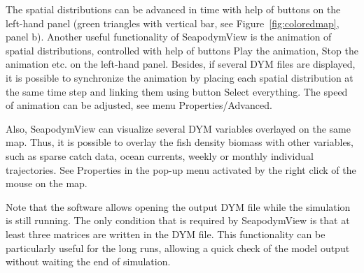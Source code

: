 The spatial distributions can be advanced in time with help of buttons on the left-hand panel (green triangles with vertical bar, see Figure~\ref{fig:coloredmap}, panel b). Another useful functionality of SeapodymView is the animation of spatial distributions, controlled with help of buttons {\ttfamily Play the animation}, {\ttfamily Stop the animation} etc. on the left-hand panel. Besides, if several DYM files are displayed, it is possible to synchronize the animation by placing each spatial distribution at the same time step and linking them using button {\ttfamily Select everything}. The speed of animation can be adjusted, see menu {\ttfamily Properties/Advanced}.

Also, SeapodymView can visualize several DYM variables overlayed on the same map. Thus, it is possible to overlay the fish density biomass with other variables, such as sparse catch data, ocean currents, weekly or monthly individual trajectories. See {\ttfamily Properties} in the pop-up menu activated by the right click of the mouse on the map. 

Note that the software allows opening the output DYM file while the simulation is still running. The only condition that is required by SeapodymView is that at least three matrices are written in the DYM file. This functionality can be particularly useful for the long runs, allowing a quick check of the model output without waiting the end of simulation. 


